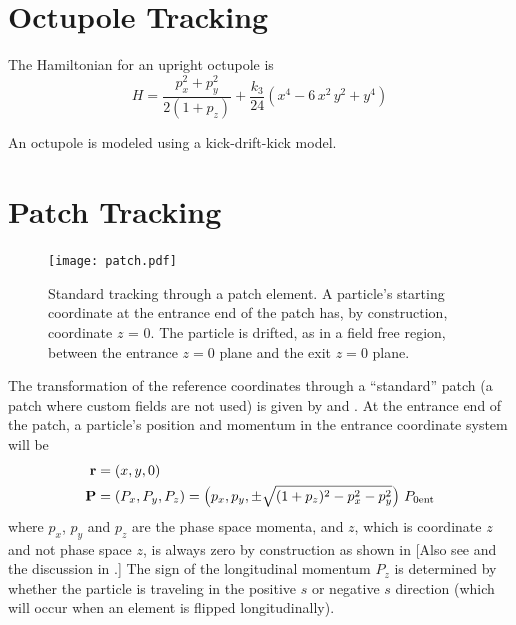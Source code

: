 \section{Octupole Tracking}
\label{s:octupole.std}

The Hamiltonian for an upright octupole is
\begin{equation}
  H = \frac{p_x^2 + p_y^2}{2 (1 + p_z)} + \frac{k_3}{24} (x^4 - 6 \, x^2 \, y^2 + y^4)
\end{equation}

An octupole is modeled using a kick-drift-kick model.

\section{Patch Tracking}
\label{s:patch.std}

\begin{figure}[tb]
  \centering
  \texttt{[image: patch.pdf]}
  \caption[Standard patch transformation.]
{Standard tracking through a patch element. A particle's starting coordinate at the entrance end of
the patch has, by construction, coordinate $z$ = 0. The particle is drifted, as in a field free
region, between the entrance $z = 0$ plane and the exit $z = 0$ plane.}
  \label{f:patch.track}
\end{figure}


The transformation of the reference coordinates through a ``standard'' patch (a patch where custom
fields are not used) is given by  and . At the entrance end of the patch, a
particle's position and momentum in the entrance coordinate system will be
\begin{alignat}{1}
  {\bf r} &= (x, y, 0) \nonumber \\
  {\bf P} &= (P_x, P_y, P_z) = 
    \left( p_x, p_y, \pm \sqrt{(1+p_z)^2 - p_x^2 - p_y^2} \right) \, P_{0\text{ent}}
\end{alignat}
where $p_x$, $p_y$ and $p_z$ are the phase space momenta, and $z$, which is coordinate $z$ and not
phase space $z$, is always zero by construction as shown in  [Also see
 and the discussion in .] The sign of the longitudinal
momentum $P_z$ is determined by whether the particle is traveling in the positive $s$ or negative
$s$ direction (which will occur when an element is flipped longitudinally).

